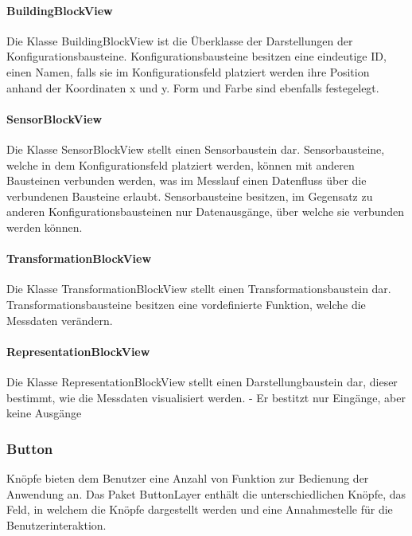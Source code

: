\documentclass[parskip=full]{scrartcl}
\begin{document}
\paragraph{BuildingBlockView}
Die Klasse BuildingBlockView ist die Überklasse der Darstellungen der Konfigurationsbausteine.
Konfigurationsbausteine besitzen eine eindeutige ID, einen Namen, falls sie im Konfigurationsfeld platziert werden ihre Position anhand der Koordinaten x und y. Form und Farbe sind ebenfalls festegelegt. 

\paragraph{SensorBlockView}
Die Klasse SensorBlockView stellt einen Sensorbaustein dar. 
Sensorbausteine, welche in dem Konfigurationsfeld platziert werden, können mit anderen Bausteinen verbunden werden, was im Messlauf einen Datenfluss über die verbundenen Bausteine erlaubt. Sensorbausteine besitzen, im Gegensatz zu anderen Konfigurationsbausteinen nur Datenausgänge, über welche sie verbunden werden können.

\paragraph{TransformationBlockView}
Die Klasse TransformationBlockView stellt einen Transformationsbaustein dar. Transformationsbausteine besitzen eine vordefinierte Funktion, welche die Messdaten verändern.

\paragraph{RepresentationBlockView}
Die Klasse RepresentationBlockView stellt einen Darstellungbaustein dar, dieser bestimmt, wie die Messdaten visualisiert werden.
- Er bestitzt nur Eingänge, aber keine Ausgänge


\newpage 

\subsubsection{Button}

Knöpfe bieten dem Benutzer eine Anzahl von Funktion zur Bedienung der Anwendung an. Das Paket ButtonLayer enthält die unterschiedlichen Knöpfe, das Feld, in welchem die Knöpfe dargestellt werden und eine Annahmestelle für die Benutzerinteraktion.
\end{document}
